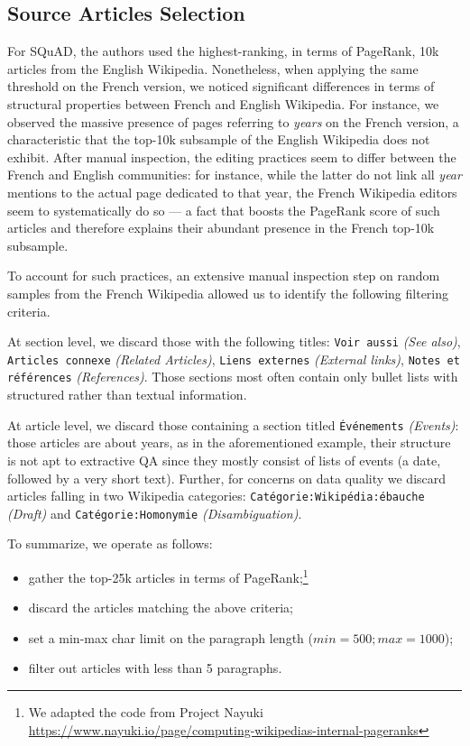\documentclass[10pt, a4paper]{article}
\begin{document}
\subsection*{Source Articles Selection}
For SQuAD, the authors used the highest-ranking, in terms of PageRank, 10k articles from the English Wikipedia. Nonetheless, when applying the same threshold on the French version, we noticed significant differences in terms of structural properties between French and English Wikipedia. For instance, we observed the massive presence of pages referring to \emph{years} on the French version, a characteristic that the top-10k subsample of the English Wikipedia does not exhibit. After manual inspection, the editing practices seem to differ between the French and English communities: for instance, while the latter do not link all \emph{year} mentions to the actual page dedicated to that year, the French Wikipedia editors seem to systematically do so --- a fact that boosts the PageRank score of such articles and therefore explains their abundant presence in the French top-10k subsample.

To account for such practices, an extensive manual inspection step on random samples from the French Wikipedia allowed us to identify the following filtering criteria. 

At section level, we discard those with the following titles: \texttt{Voir aussi} \emph{(See also)}, \texttt{Articles connexe} \emph{(Related Articles)}, \texttt{Liens externes} \emph{(External links)}, \texttt{Notes et références} \emph{(References)}. Those sections most often contain only bullet lists with structured rather than textual information.

At article level, we discard those containing a section titled \texttt{Événements} \emph{(Events)}: those articles are about years, as in the aforementioned example, their structure is not apt to extractive QA since they mostly consist of lists of events (a date, followed by a very short text). Further, for concerns on data quality we discard articles falling in two Wikipedia categories: \texttt{Catégorie:Wikipédia:ébauche} \emph{(Draft)} and  \texttt{Catégorie:Homonymie} \emph{(Disambiguation)}.


To summarize, we operate as follows:
\begin{itemize}
    \item gather the top-25k articles in terms of PageRank;\footnote{We adapted the code from Project Nayuki \url{https://www.nayuki.io/page/computing-wikipedias-internal-pageranks}}
    \item discard the articles matching the above criteria;
    \item set a min-max char limit on the paragraph length ($min=500; max=1000$);
    \item filter out articles with less than 5 paragraphs.
\end{itemize}
\end{document}
